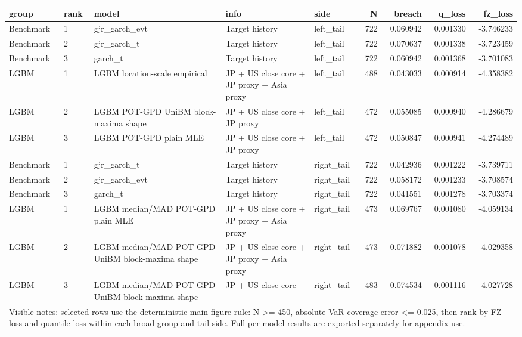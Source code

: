 \begin{tabular}{ll ll lrrrr}
\toprule
group & rank & model & info & side & N & breach & q_loss & fz_loss \\
\midrule
Benchmark & 1 & gjr\_garch\_evt & Target history & left\_tail & 722 & 0.060942 & 0.001330 & -3.746233 \\
Benchmark & 2 & gjr\_garch\_t & Target history & left\_tail & 722 & 0.070637 & 0.001338 & -3.723459 \\
Benchmark & 3 & garch\_t & Target history & left\_tail & 722 & 0.060942 & 0.001368 & -3.701083 \\
LGBM & 1 & LGBM location-scale empirical & JP + US close core + JP proxy + Asia proxy & left\_tail & 488 & 0.043033 & 0.000914 & -4.358382 \\
LGBM & 2 & LGBM POT-GPD UniBM block-maxima shape & JP + US close core + JP proxy & left\_tail & 472 & 0.055085 & 0.000940 & -4.286679 \\
LGBM & 3 & LGBM POT-GPD plain MLE & JP + US close core + JP proxy & left\_tail & 472 & 0.050847 & 0.000941 & -4.274489 \\
Benchmark & 1 & gjr\_garch\_t & Target history & right\_tail & 722 & 0.042936 & 0.001222 & -3.739711 \\
Benchmark & 2 & gjr\_garch\_evt & Target history & right\_tail & 722 & 0.058172 & 0.001233 & -3.708574 \\
Benchmark & 3 & garch\_t & Target history & right\_tail & 722 & 0.041551 & 0.001278 & -3.703374 \\
LGBM & 1 & LGBM median/MAD POT-GPD plain MLE & JP + US close core + JP proxy + Asia proxy & right\_tail & 473 & 0.069767 & 0.001080 & -4.059134 \\
LGBM & 2 & LGBM median/MAD POT-GPD UniBM block-maxima shape & JP + US close core + JP proxy + Asia proxy & right\_tail & 473 & 0.071882 & 0.001078 & -4.029358 \\
LGBM & 3 & LGBM median/MAD POT-GPD UniBM block-maxima shape & JP + US close core & right\_tail & 483 & 0.074534 & 0.001116 & -4.027728 \\
\midrule
\multicolumn{9}{l}{\footnotesize Visible notes: selected rows use the deterministic main-figure rule: N >= 450, absolute VaR coverage error <= 0.025, then rank by FZ loss and quantile loss within each broad group and tail side. Full per-model results are exported separately for appendix use.} \\
\bottomrule
\end{tabular}
